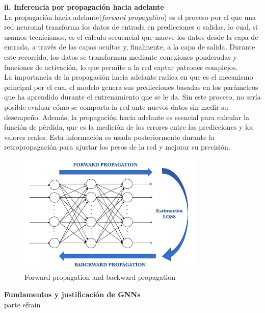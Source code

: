 \documentclass[11pt]{article} %
\begin{document}
\textbf{ii. Inferencia por propagación hacia adelante} \\[3pt]
La propagación hacia adelante(\textit{forward propagation}) es el proceso por el que una red neuronal transforma los datos de entrada en predicciones o salidas, lo cual, si usamos tecnicismos, es el cálculo secuencial que mueve los datos desde la capa de entrada, a través de las capas ocultas y, finalmente, a la capa de salida. Durante este recorrido, los datos se transforman mediante conexiones ponderadas y funciones de activación, lo que permite a la red captar patrones complejos. \\
La importancia de la propagación hacia adelante radica en que es el mecanismo principal por el cual el modelo genera sus predicciones basadas en los parámetros que ha aprendido durante el entrenamiento que se le da. Sin este proceso, no sería posible evaluar cómo se comporta la red ante nuevos datos sin medir su desempeño. Además, la propagación hacia adelante es esencial para calcular la función de pérdida, que es la medición de los errores entre las predicciones y los valores reales. Esta información es usada posteriormente durante la retropropagación  para ajustar los pesos de la red y mejorar su precisión.
\begin{figure}[H]
    \centering
    \includegraphics[width=0.8\textwidth]{Images/3eafe158-4126-48f0-ae70-65e707cc8988_668x427.jpg}
    \caption{Forward propagation and backward propagation}
    \label{fig:estructura-red-neuronal}
\end{figure}
\newpage
\thispagestyle{empty}
{\large \textbf{Fundamentos y justificación de GNNs}} \vspace{5pt}
\\
parte efrain

\newpage
\nocite{*}
\printbibliography
\end{document}
